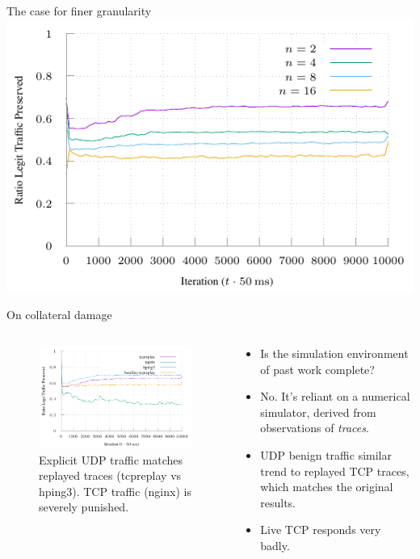 \documentclass[aspectratio=169,xcolor={dvipsnames}
,hide notes
]{beamer}
\begin{document}
\begin{frame}{The case for finer granularity}
\centering
\includegraphics[width=0.8\linewidth]{../plots/online-varyN-binary.pdf}
\end{frame}

\begin{frame}{On collateral damage}
\begin{columns}
	\begin{column}{0.5\linewidth}
		\begin{figure}
			\includegraphics[width=\linewidth]{../plots/online-varyN-nginx.pdf}
			\caption{Explicit UDP traffic matches replayed traces (tcpreplay vs hping3). TCP traffic (nginx) is severely punished.}
		\end{figure}
	\end{column}
	\begin{column}{0.45\linewidth}
		\begin{itemize}
			\item Is the simulation environment of past work complete?
			\item \alert{No.} It's reliant on a numerical simulator, derived from observations of \emph{traces}.
			\item UDP benign traffic similar trend to replayed TCP traces, which matches the original results.
			\item Live TCP responds very badly.
		\end{itemize}
	\end{column}
\end{columns}
\end{frame}
\end{document}
